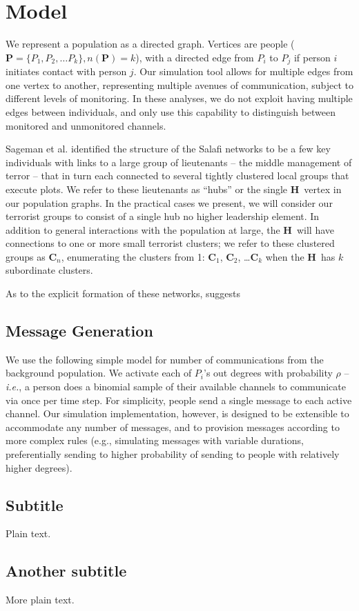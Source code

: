 \documentclass{article}
\newcommand{\Hub}[0]{\ensuremath{\mathbf{H}}}
\newcommand{\C}[1]{\ensuremath{\mathbf{C}_{#1}}}
\begin{document}
\section*{Model}
We represent a population as a directed graph.  Vertices are people ($\mathbf{P}=\{P_1, P_2, \ldots P_k\}, n(\mathbf{P})=k$), with a directed edge from $P_i$ to $P_j$ if person $i$ initiates contact with person $j$.  Our simulation tool allows for multiple edges from one vertex to another, representing multiple avenues of communication, subject to different levels of monitoring.  In these analyses, we do not exploit having multiple edges between individuals, and only use this capability to distinguish between monitored and unmonitored channels.  

Sageman et al. identified the structure of the Salafi networks to be a few key individuals with links to a large group of lieutenants -- the middle management of terror -- that in turn each connected to several tightly clustered local groups that execute plots.  We refer to these lieutenants as ``hubs'' or the single \Hub\ vertex in our population graphs.  In the practical cases we present, we will consider our terrorist groups to consist of a single hub no higher leadership element.  In addition to general interactions with the population at large, the \Hub\ will have connections to one or more small terrorist clusters; we refer to these clustered groups as \C{n}, enumerating the clusters from 1: \C{1}, \C{2}, \ldots \C{k} when the \Hub\ has $k$ subordinate clusters.

As to the explicit formation of these networks, \cite{sageman} suggests



\subsection*{Message Generation}

We use the following simple model for number of communications from the background population.  We activate each of $P_i$'s out degrees with probability $\rho$ -- {\em i.e.}, a person does a binomial sample of their available channels to communicate via once per time step.  For simplicity, people send a single message to each active channel.  Our simulation implementation, however, is designed to be extensible to accommodate any number of messages, and to provision messages according to more complex rules (e.g., simulating messages with variable durations, preferentially sending to higher probability of sending to people with relatively higher degrees).

\subsection{Subtitle}

Plain text.

\subsection{Another subtitle}

More plain text.

\newpage


\end{document}
